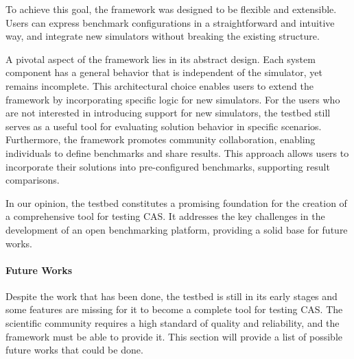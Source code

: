 \documentclass[12pt,a4paper,openright,twoside]{book}
\begin{document}
To achieve this goal, the framework was designed to be flexible and extensible.
Users can express benchmark configurations in a straightforward and intuitive way, and integrate new simulators without breaking the existing structure.

A pivotal aspect of the framework lies in its abstract design. 
Each system component has a general behavior that is independent of the simulator, yet remains incomplete.
This architectural choice enables users to extend the framework by incorporating specific logic for new simulators.
For the users who are not interested in introducing support for new simulators, the testbed still serves as a useful tool for evaluating solution behavior in specific scenarios.
Furthermore, the framework promotes community collaboration, enabling individuals to define benchmarks and share results.
This approach allows users to incorporate their solutions into pre-configured benchmarks, supporting result comparisons.

In our opinion, the testbed constitutes a promising foundation for the creation of a comprehensive tool for testing \ac*{CAS}.
It addresses the key challenges in the development of an open benchmarking platform, providing a solid base for future works.

\paragraph*{Future Works}

Despite the work that has been done, the testbed is still in its early stages and some features are missing for it to become a complete tool for testing \ac*{CAS}.
The scientific community requires a high standard of quality and reliability, and the framework must be able to provide it.
This section will provide a list of possible future works that could be done.
\end{document}
